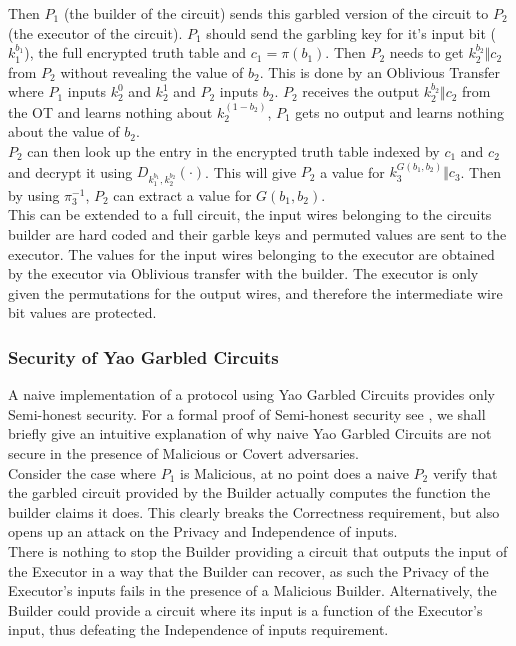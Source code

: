 \documentclass[a4paper,11pt]{article}
\begin{document}
				Then $P_1$ (the builder of the circuit) sends this garbled version of the circuit to $P_2$ (the executor of the circuit). $P_1$ should send the garbling key for it's input bit ($k_1^{b_1}$), the full encrypted truth table and $c_1 = \pi(b_1)$. Then $P_2$ needs to get $k_2^{b_2} \Vert c_2$ from $P_2$ without revealing the value of $b_2$. This is done by an Oblivious Transfer where $P_1$ inputs $k_2^0$ and $k_2^1$ and $P_2$ inputs $b_2$. $P_2$ receives the output $k_2^{b_2} \Vert c_2$ from the OT and learns nothing about $k_2^{(1 - b_2)} $, $P_1$ gets no output and learns nothing about the value of $b_2$.\\

				$P_2$ can then look up the entry in the encrypted truth table indexed by $c_1$ and $c_2$ and decrypt it using $D_{k_1^{b_1}, k_2^{b_2}}(\cdot)$. This will give $P_2$ a value for $k_3^{G(b_1, b_2)} \Vert c_3$. Then by using $\pi_3^{-1}$, $P_2$ can extract a value for $G(b_1, b_2)$.\\

				This can be extended to a full circuit, the input wires belonging to the circuits builder are hard coded and their garble keys and permuted values are sent to the executor. The values for the input wires belonging to the executor are obtained by the executor via Oblivious transfer with the builder. The executor is only given the permutations for the output wires, and therefore the intermediate wire bit values are protected.

			\subsubsection{Security of Yao Garbled Circuits}
				A naive implementation of a protocol using Yao Garbled Circuits provides only Semi-honest security. For a formal proof of Semi-honest security see \cite{ProofOfYaoSecurity}, we shall briefly give an intuitive explanation of why naive Yao Garbled Circuits are not secure in the presence of Malicious or Covert adversaries.\\

				Consider the case where $P_1$ is Malicious, at no point does a naive $P_2$ verify that the garbled circuit provided by the Builder actually computes the function the builder claims it does. This clearly breaks the Correctness requirement, but also opens up an attack on the Privacy and Independence of inputs.\\

				There is nothing to stop the Builder providing a circuit that outputs the input of the Executor in a way that the Builder can recover, as such the Privacy of the Executor's inputs fails in the presence of a Malicious Builder. Alternatively, the Builder could provide a circuit where its input is a function of the Executor's input, thus defeating the Independence of inputs requirement.
\end{document}

